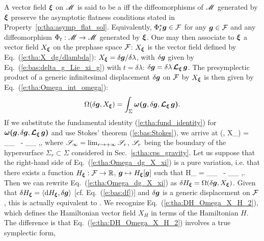 A vector field $\bm{\xi}$ on $\mathscr{M}$ is said to be a
iff the diffeomorphisms of $\mathscr{M}$ generated
by $\bm{\xi}$ preserve the asymptotic flatness conditions stated in Property~\ref{p:tha:asymp_flat_sol}.
Equivalently, $\Phi_t^*\bm{g}\in \mathcal{F}$ for any $\bm{g}\in\mathcal{F}$ and any diffeomorphism
$\Phi_t:\mathscr{M} \to \mathscr{M}$ generated by $\bm{\xi}$.
One may then associate to $\bm{\xi}$ a vector field
$X_{\bm{\xi}}$ on the prephase space $\mathcal{F}$: $X_{\bm{\xi}}$ is the
vector field defined by Eq.~(\ref{e:tha:X_dg/dlambda}):
$X_{\bm{\xi}} = \delta\bm{g} / \delta\lambda$, with $\delta\bm{g}$ given
by Eq.~(\ref{e:bas:delta_g_Lie_xi_g}) with $t=\delta\lambda$: $\delta\bm{g} = \delta\lambda\, \bm{\mathcal{L}}_{\bm{\xi}}\, \bm{g}$.
The presymplectic product of a generic infinitesimal displacement $\delta\bm{g}$ on
$\mathcal{F}$ by $X_{\bm{\xi}}$ is then given by Eq.~(\ref{e:tha:Omega_int_omega}):
\[
    \Omega(\delta\bm{g}, X_{\bm{\xi}}) =
        \int_{\Sigma} \bm{\omega} \textbf{(}\bm{g},\delta\bm{g},\bm{\mathcal{L}}_{\bm{\xi}}\,\bm{g}\textbf{)} .
\]
If we substitute the fundamental identity (\ref{e:tha:fund_identity}) for $\bm{\omega} \textbf{(}\bm{g},\delta\bm{g},\bm{\mathcal{L}}_{\bm{\xi}}\,\bm{g}\textbf{)}$ and use Stokes' theorem (\ref{e:bas:Stokes}), we arrive at
\be \label{e:tha:Omega_dg_X_xi}
    \Omega(\delta{}, X_{\w{\xi}}) =
       \delta \int_{\Sp_\infty}\!\! \lld\w{\xi}\rld
    \ -  \int_{\Sp_\infty} \!\! \w{\xi}\cdot\w{\theta}\lld{},\delta{}\rld ,
\ee
where $\mathscr{S}_\infty = \lim_{r\to +\infty} \mathscr{S}_r$, $\mathscr{S}_r$ being the boundary
of the hypersurface $\Sigma_r \subset \Sigma$ considered in Sec.~\ref{s:tha:cps_gravity}.
Let us suppose that the right-hand side of Eq.~(\ref{e:tha:Omega_dg_X_xi}) is a
pure variation, i.e. that there exists a function $H_{\bm{\xi}}: \mathcal{F} \to \mathbb{R}$,
$\bm{g}\mapsto H_{\bm{\xi}}[\bm{g}]$ such that
\be \label{e:tha:delta_H_xi}
    \delta H_{\w{\xi}} = \delta \int_{\Sp_\infty}\!\! \lld\w{\xi}\rld
    \ -  \int_{\Sp_\infty} \!\! \w{\xi}\cdot\w{\theta}\lld{},\delta{}\rld .
\ee
Then we can rewrite Eq.~(\ref{e:tha:Omega_dg_X_xi}) as
$\delta H_{\bm{\xi}} = \Omega(\delta\bm{g}, X_{\bm{\xi}})$.
Given that
$\delta H_{\bm{\xi}} = \langle \mathrm{d} H_{\bm{\xi}}, \delta\bm{g} \rangle$
[cf. Eq.~(\ref{e:bas:df})] and $\delta\bm{g}$ is a generic displacement
on $\mathcal{F}$, this is
actually equivalent to
\be \label{e:tha:DHxi_Omega_X_xi}
     .
\ee
We recognize Eq.~(\ref{e:tha:DH_Omega_X_H_2}), which defines the Hamiltonian
vector field $X_H$ in terms of the Hamiltonian $H$. The difference is
that Eq.~(\ref{e:tha:DH_Omega_X_H_2}) involves a true symplectic form,
